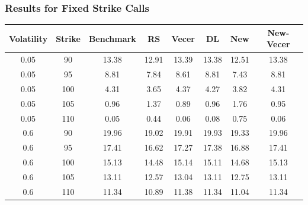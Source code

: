 \documentclass{beamer}
\begin{document}
  \begin{frame}
    \frametitle{Results for Fixed Strike Calls}
    \small
    \begin{table}[h]
      \begin{tabular}{|c|c|c|c|c|c|c|c|}
      \hline
      Volatility & Strike & Benchmark & RS & Vecer & DL & New & New-Vecer \\
      \hline
      0.05 & 90 & 13.38 & 12.91 & 13.39 & 13.38 & 12.51 & 13.38 \\
      0.05 & 95 & 8.81 & 7.84 & 8.61 & 8.81 & 7.43 & 8.81 \\
      0.05 & 100 & 4.31 & 3.65 & 4.37 & 4.27 & 3.82 & 4.31 \\
      0.05 & 105 & 0.96 & 1.37 & 0.89 & 0.96 & 1.76 & 0.95 \\
      0.05 & 110 & 0.05 & 0.44 & 0.06 & 0.08 & 0.75 & 0.06 \\
      0.6 & 90 & 19.96 & 19.02 & 19.91 & 19.93 & 19.33 & 19.96 \\
      0.6 & 95 & 17.41 & 16.62 & 17.27 & 17.38 & 16.88 & 17.41 \\
      0.6 & 100 & 15.13 & 14.48 & 15.14 & 15.11 & 14.68 & 15.13 \\
      0.6 & 105 & 13.11 & 12.57 & 13.04 & 13.11 & 12.75 & 13.11 \\
      0.6 & 110 & 11.34 & 10.89 & 11.38 & 11.34 & 11.04 & 11.34 \\
      \hline
      \end{tabular}
    \end{table}
  \end{frame}
\end{document}
